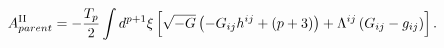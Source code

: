 \begin{equation}
A^{{\rm II}}_{parent}=-\frac{T_p}{2}\int d^{p+1}{\xi}\left[\sqrt{-G}
\left(-G_{ij}h^{ij}+(p+3)\right)+{\Lambda}^{ij}\left(G_{ij}-g_{ij}
\right)\right].
\end{equation}

